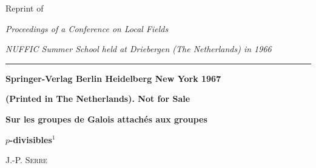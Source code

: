 \begin{center}
Reprint of

\textit{Proceedings of a Conference on Local Fields}

\textit{NUFFIC Summer School held at Driebergen (The Netherlands) in 1966}

\rule{0.85\linewidth}{0.4pt}

\textbf{Springer-Verlag Berlin Heidelberg New York 1967}

\textbf{(Printed in The Netherlands). Not for Sale}

\textbf{Sur les groupes de Galois attachés aux groupes}

\textbf{$p$-divisibles}$^{1}$

J.-P. \textsc{Serre}
\end{center}
